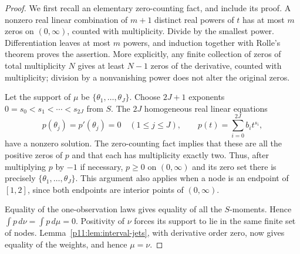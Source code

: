 \documentclass[11pt,letterpaper]{article}
\theoremstyle{definition}
\theoremstyle{remark}
\newcommand{\1}{\mathbf 1}
\begin{document}
\begin{proof}
We first recall an elementary zero-counting fact, and include its
proof.  A nonzero real linear combination of $m+1$ distinct real
powers of $t$ has at most $m$ zeros on $(0,\infty)$, counted with
multiplicity.  Divide by the smallest power.  Differentiation leaves
at most $m$ powers, and induction together with Rolle's theorem proves
the assertion.  More explicitly, any finite collection of zeros of
total multiplicity $N$ gives at least $N-1$ zeros of the derivative,
counted with multiplicity; division by a nonvanishing power does not
alter the original zeros.

Let the support of $\mu$ be $\{\theta_1,\ldots,\theta_J\}$.  Choose
$2J+1$ exponents $0=s_0<s_1<\cdots<s_{2J}$ from $S$.  The $2J$
homogeneous real linear equations
\[
 p(\theta_j)=p'(\theta_j)=0\quad(1\leq j\leq J),\qquad
 p(t)=\sum_{i=0}^{2J}b_i t^{s_i},
\]
have a nonzero solution.  The zero-counting fact implies that these
are all the positive zeros of $p$ and that each has multiplicity
exactly two.  Thus, after multiplying $p$ by $-1$ if necessary,
$p\geq0$ on $(0,\infty)$ and its zero set there is precisely
$\{\theta_1,\ldots,\theta_J\}$.  This argument also applies when a
node is an endpoint of $[1,2]$, since both endpoints are interior
points of $(0,\infty)$.

Equality of the one-observation laws gives equality of all the
$S$-moments.  Hence $\int p\,d\nu=\int p\,d\mu=0$.  Positivity of
$\nu$ forces its support to lie in the same finite set of nodes.
Lemma~\ref{p11:lem:interval-jets}, with derivative order zero, now gives
equality of the weights, and hence $\mu=\nu$.
\end{proof}
\end{document}
